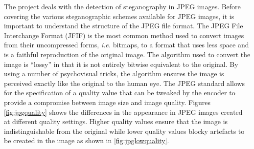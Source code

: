 The project deals with the detection of steganography in JPEG images. Before covering the various steganographic schemes available for JPEG images, it is important to understand the structure of the JPEG file format. The JPEG File Interchange Format (JFIF) is the most common method used to convert images from their uncompressed forms, \emph{i.e.} bitmaps, to a format that uses less space and is a faithful reproduction of the original image. The algorithm used to convert the image is ``lossy'' in that it is not entirely bitwise equivalent to the original. By using a number of psychovisual tricks, the algorithm ensures the image is perceived exactly like the original to the human eye. The JPEG standard allows for the specification of a quality value that can be tweaked by the encoder to provide a compromise between image size and image quality. Figures \ref{fig:jpgquality} shows the differences in the appearance in JPEG images created at different quality settings. Higher quality values ensure that the image is indistinguishable from the original while lower quality values blocky artefacts to be created in the image as shown in \ref{fig:jpglowquality}.
